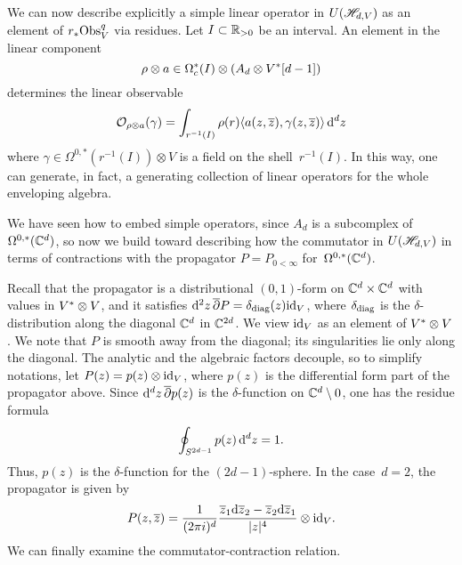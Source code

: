 We can now describe explicitly a simple linear operator in $U(\mathscr H_{d,V})$ as an element of $r_* {\rm Obs}^q_V$ via residues.   
Let $I \subset \mathbb R_{>0}$ be an interval. 
An element in the linear component 
\[
\rho \otimes a \in \Omega^*_c(I) \otimes \left(A_d \otimes V^*[d-1]\right)
\] 
determines the linear observable 
\[
\mathcal O_{\rho \otimes a}(\gamma) = \int_{r^{-1}(I)} \rho(r) \langle a(z,\overline{z}), \gamma(z,\overline{z})\rangle \,{\rm d}^d z 
\] 
where $\gamma \in \Omega^{0,*}(r^{-1}(I)) \otimes V$ is a field on the shell~$r^{-1}(I)$.
In this way, one can generate, in fact, a generating collection of linear operators for the whole enveloping algebra.

We have seen how to embed simple operators,
since $A_d$ is a subcomplex of $\Omega^{0,*}(\mathbb C^d)$,
so now we build toward describing how the commutator in $U(\mathscr H_{d,V})$ in terms of contractions with the propagator $P = P_{0 < \infty}$ for~$\Omega^{0,*}(\mathbb C^d)$. 

Recall that the propagator is a distributional $(0,1)$-form on $\mathbb C^d \times \mathbb C^d$ with values in $V^* \otimes V$, 
and it satisfies ${\rm d}^2 z\, \overline{\partial} P = \delta_{{\rm diag}} (z) {\rm id}_V$, where $\delta_{{\rm diag}}$ is the $\delta$-distribution along the diagonal $\mathbb C^d$ in $\mathbb C^{2d}$. 
We view ${\rm id}_V$ as an element of $V^* \otimes V$. 
We note that $P$ is smooth away from the diagonal; 
its singularities lie only along the diagonal.
The analytic and the algebraic factors decouple, 
so to simplify notations, let $P(z) = p(z) \otimes {\rm id}_V$, 
where $p(z)$ is the differential form part of the propagator above. 
Since ${\rm d}^d z \, \overline{\partial} p(z)$ is the $\delta$-function on $\mathbb C^d \setminus 0$,
one has the residue formula
\[
\oint_{S^{2d-1}} p(z) \,{\rm d}^d z = 1 .
\]
Thus, $p(z)$ is the $\delta$-function for the $(2d-1)$-sphere.
In the case~$d=2$,
the propagator is given by
\[
P (z,\overline{z}) = \frac{1}{(2\pi i)^d} \frac{\overline{z}_1 {\rm d} \overline{z}_2 - \overline{z}_2 {\rm d} \overline{z}_1}{|z|^4} \otimes {\rm id}_{V}.
\]
We can finally examine the commutator-contraction relation.

